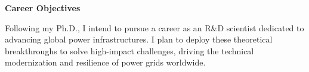 \documentclass[12pt,letterpaper]{article}
\begin{document}
\vspace{1ex}
\noindent \textbf{Career Objectives}

Following my Ph.D., I intend to pursue a career as an R\&D scientist dedicated to advancing global power infrastructures. I plan to deploy these theoretical breakthroughs to solve high-impact challenges, driving the technical modernization and resilience of power grids worldwide.
\end{document}
